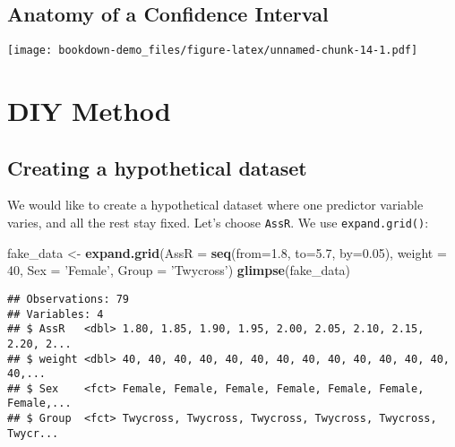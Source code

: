 \documentclass[]{book}
\newenvironment{Shaded}{\begin{snugshade}}{\end{snugshade}}
\newcommand{\DataTypeTok}[1]{\textcolor[rgb]{0.13,0.29,0.53}{#1}}
\newcommand{\DecValTok}[1]{\textcolor[rgb]{0.00,0.00,0.81}{#1}}
\newcommand{\FloatTok}[1]{\textcolor[rgb]{0.00,0.00,0.81}{#1}}
\newcommand{\KeywordTok}[1]{\textcolor[rgb]{0.13,0.29,0.53}{\textbf{#1}}}
\newcommand{\NormalTok}[1]{#1}
\newcommand{\OperatorTok}[1]{\textcolor[rgb]{0.81,0.36,0.00}{\textbf{#1}}}
\newcommand{\StringTok}[1]{\textcolor[rgb]{0.31,0.60,0.02}{#1}}
\begin{document}
\hypertarget{anatomy-of-a-confidence-interval}{%
\subsection{Anatomy of a Confidence Interval}\label{anatomy-of-a-confidence-interval}}

\begin{Shaded}
\end{Shaded}

\texttt{[image: bookdown-demo\_files/figure-latex/unnamed-chunk-14-1.pdf]}

\hypertarget{diy-method}{%
\section{DIY Method}\label{diy-method}}

\hypertarget{creating-a-hypothetical-dataset}{%
\subsection{Creating a hypothetical dataset}\label{creating-a-hypothetical-dataset}}

We would like to create a hypothetical dataset where one predictor variable varies, and all the rest stay fixed. Let's choose \texttt{AssR}. We use \texttt{expand.grid()}:

\begin{Shaded}
\begin{Highlighting}[]
\NormalTok{fake_data <-}\StringTok{ }\KeywordTok{expand.grid}\NormalTok{(}\DataTypeTok{AssR =} \KeywordTok{seq}\NormalTok{(}\DataTypeTok{from=}\FloatTok{1.8}\NormalTok{, }\DataTypeTok{to=}\FloatTok{5.7}\NormalTok{, }\DataTypeTok{by=}\FloatTok{0.05}\NormalTok{),}
                         \DataTypeTok{weight =} \DecValTok{40}\NormalTok{,}
                         \DataTypeTok{Sex =} \StringTok{'Female'}\NormalTok{,}
                         \DataTypeTok{Group =} \StringTok{'Twycross'}\NormalTok{)}
\KeywordTok{glimpse}\NormalTok{(fake_data)}
\end{Highlighting}
\end{Shaded}

\begin{verbatim}
## Observations: 79
## Variables: 4
## $ AssR   <dbl> 1.80, 1.85, 1.90, 1.95, 2.00, 2.05, 2.10, 2.15, 2.20, 2...
## $ weight <dbl> 40, 40, 40, 40, 40, 40, 40, 40, 40, 40, 40, 40, 40, 40,...
## $ Sex    <fct> Female, Female, Female, Female, Female, Female, Female,...
## $ Group  <fct> Twycross, Twycross, Twycross, Twycross, Twycross, Twycr...
\end{verbatim}
\end{document}

